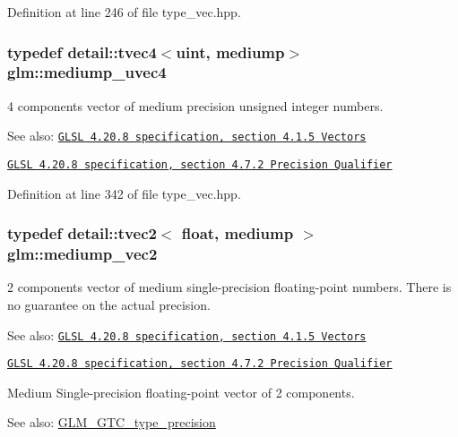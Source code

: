 Definition at line 246 of file type\_\-vec.hpp.\hypertarget{group__core__precision_gd90c29c2643136a9bcb1165eac47c810}{
\subsubsection[mediump\_\-uvec4]{\setlength{\rightskip}{0pt plus 5cm}typedef detail::tvec4$<$uint, mediump$>$ {\bf glm::mediump\_\-uvec4}}}
\label{group__core__precision_gd90c29c2643136a9bcb1165eac47c810}


4 components vector of medium precision unsigned integer numbers.

\begin{Desc}
\item[See also:]\href{http://www.opengl.org/registry/doc/GLSLangSpec.4.20.8.pdf}{\tt GLSL 4.20.8 specification, section 4.1.5 Vectors} 

\href{http://www.opengl.org/registry/doc/GLSLangSpec.4.20.8.pdf}{\tt GLSL 4.20.8 specification, section 4.7.2 Precision Qualifier} \end{Desc}


Definition at line 342 of file type\_\-vec.hpp.\hypertarget{group__core__precision_g1365858c541931eb8a7473fa85a1d1cf}{
\subsubsection[mediump\_\-vec2]{\setlength{\rightskip}{0pt plus 5cm}typedef detail::tvec2$<$ float, mediump $>$ {\bf glm::mediump\_\-vec2}}}
\label{group__core__precision_g1365858c541931eb8a7473fa85a1d1cf}


2 components vector of medium single-precision floating-point numbers. There is no guarantee on the actual precision.

\begin{Desc}
\item[See also:]\href{http://www.opengl.org/registry/doc/GLSLangSpec.4.20.8.pdf}{\tt GLSL 4.20.8 specification, section 4.1.5 Vectors} 

\href{http://www.opengl.org/registry/doc/GLSLangSpec.4.20.8.pdf}{\tt GLSL 4.20.8 specification, section 4.7.2 Precision Qualifier}\end{Desc}
Medium Single-precision floating-point vector of 2 components. \begin{Desc}
\item[See also:]\hyperlink{group__gtc__type__precision}{GLM\_\-GTC\_\-type\_\-precision} \end{Desc}


